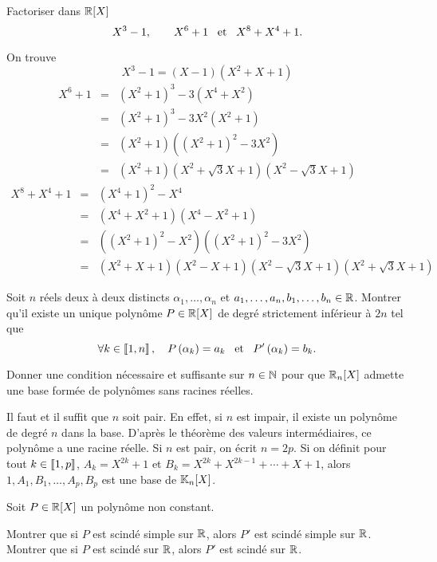 \documentclass{magnolia}
\begin{document}
Factoriser dans $\polyR$
\[X^3-1, \qquad X^6+1 \quad\!\text{et}\quad\! X^8+X^4+1.\]
\begin{sol}
On trouve
\[X^3-1=(X-1)(X^2+X+1)\]
\begin{eqnarray*}
X^6+1&=&(X^2+1)^3-3(X^4+X^2)\\
     &=&(X^2+1)^3-3X^2(X^2+1)\\
     &=&(X^2+1)((X^2+1)^2-3X^2)\\
     &=&(X^2+1)(X^2+\sqrt{3}X+1)(X^2-\sqrt{3}X+1)
\end{eqnarray*}
\begin{eqnarray*}
X^8+X^4+1&=&(X^4+1)^2-X^4\\
         &=&(X^4+X^2+1)(X^4-X^2+1)\\
         &=&((X^2+1)^2-X^2)((X^2+1)^2-3X^2)\\
         &=&(X^2+X+1)(X^2-X+1)(X^2-\sqrt{3}X+1)(X^2+\sqrt{3}X+1)
\end{eqnarray*}
\end{sol}

Soit $n$ réels deux à deux distincts $\alpha_1,\ldots,\alpha_n$ et
$a_1,\ldots,a_n,b_1,\ldots,b_n\in\mathbb{R}$. Montrer qu'il existe un unique polynôme
$P\in\polyR$ de degré strictement inférieur à $2n$ tel que
\[\forall k\in\left\llbracket 1,n\right\rrbracket ,\quad P\left(\alpha_k\right)=a_k \quad\!\text{et}\quad\! P'\left(\alpha_k\right)=b_k.\]


Donner une condition nécessaire et suffisante sur $n\in\mathbb{N}$ pour que
$\polyR[n]$ admette une base formée de polynômes sans racines réelles.
\begin{sol}
Il faut et il suffit que $n$ soit pair. En effet, si $n$ est impair, il existe
un polynôme de degré $n$ dans la base. D'après le théorème des valeurs
intermédiaires, ce polynôme a une racine réelle. Si $n$ est pair, on
écrit $n=2p$. Si on définit pour tout $k\in\left\llbracket 1,p\right\rrbracket$,
$A_k=X^{2k}+1$ et $B_k=X^{2k}+X^{2k-1}+\cdots+X+1$, alors
$1,A_1,B_1,\ldots,A_p,B_p$ est une base de $\polyK[n]$.
\end{sol}

Soit $P\in\polyR$ un polynôme non constant.
\begin{questions}
\question Montrer que si $P$ est scindé simple sur $\mathbb{R}$, alors $P'$ est scindé simple sur $\mathbb{R}$.
\question Montrer que si $P$ est scindé sur $\mathbb{R}$, alors $P'$ est scindé sur $\mathbb{R}$.
\end{questions}

\end{document}
